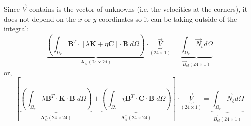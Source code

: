 Since $\vec V$ contains is the vector of unknowns (i.e. the velocities at the corners), 
it does not depend on the $x$ or $y$ coordinates
so it can be taking outside of the integral:
\[
\underbrace{
\left(\int_{\Omega_e} {\bm B}^T \cdot [ \lambda {\bm K} + \eta {\bm C} ] \cdot {\bm B} \;  d\Omega \right) 
}_{\bm A_{el}(24 \times 24)}
\cdot 
\underbrace{
{\vec V}
}_{(24\times 1)}
=
\underbrace{
\int_{\Omega_e} {\vec N}_b d\Omega 
}_{\vec B_{el} (24\times 1)}
\]
or, 
\[
\left[
\underbrace{
\left(\int_{\Omega_e} \lambda {\bm B}^T \cdot {\bm K} \cdot {\bm B} \; d\Omega \right) 
}_{\bm A_{el}^\lambda(24 \times 24)}
+
\underbrace{
\left(\int_{\Omega_e}  \eta {\bm B}^T \cdot {\bm C}  \cdot {\bm B} \;  d\Omega \right) 
}_{\bm A_{el}^\eta(24 \times 24)}
\right]
\cdot 
\underbrace{
{\vec V}
}_{(24\times 1)}
=
\underbrace{
\int_{\Omega_e} {\vec N}_b d\Omega 
}_{\vec B_{el} (24\times 1)}
\]

\Literature \cite{odks82,dhhu86}


